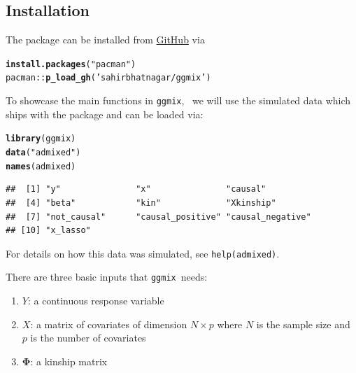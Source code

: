 \documentclass[12pt,letter]{article}\usepackage[]{graphicx}\usepackage[]{color}
\makeatletter
\newcommand{\hlstr}[1]{\textcolor[rgb]{0.192,0.494,0.8}{#1}}%
\newcommand{\hlopt}[1]{\textcolor[rgb]{0,0,0}{#1}}%
\newcommand{\hlstd}[1]{\textcolor[rgb]{0.345,0.345,0.345}{#1}}%
\newcommand{\hlkwd}[1]{\textcolor[rgb]{0.737,0.353,0.396}{\textbf{#1}}}%
\newenvironment{kframe}{%
 \def\at@end@of@kframe{}%
 \ifinner\ifhmode%
  \def\at@end@of@kframe{\end{minipage}}%
  \begin{minipage}{\columnwidth}%
 \fi\fi%
 \def\FrameCommand##1{\hskip\@totalleftmargin \hskip-\fboxsep
 \colorbox{shadecolor}{##1}\hskip-\fboxsep
     \hskip-\linewidth \hskip-\@totalleftmargin \hskip\columnwidth}%
 \MakeFramed {\advance\hsize-\width
   \@totalleftmargin\z@ \linewidth\hsize
   \@setminipage}}%
 {\par\unskip\endMakeFramed%
 \at@end@of@kframe}
\newenvironment{knitrout}{}{} %
\newcommand{\ggmix}{\texttt{ggmix}}
\makeatother
\begin{document}
\subsection{Installation}

The package can be installed from \href{https://github.com/sahirbhatnagar/ggmix}{GitHub} via


\begin{knitrout}\scriptsize
{}\color{fgcolor}\begin{kframe}
\begin{alltt}
\hlkwd{install.packages}\hlstd{(}\hlstr{"pacman"}\hlstd{)}
\hlstd{pacman}\hlopt{::}\hlkwd{p_load_gh}\hlstd{(}\hlstr{'sahirbhatnagar/ggmix'}\hlstd{)}
\end{alltt}
\end{kframe}
\end{knitrout}

To showcase the main functions in \ggmix, ~we will use the simulated data which ships with the package and can be loaded via:

\begin{knitrout}\scriptsize
{}\color{fgcolor}\begin{kframe}
\begin{alltt}
\hlkwd{library}\hlstd{(ggmix)}
\hlkwd{data}\hlstd{(}\hlstr{"admixed"}\hlstd{)}
\hlkwd{names}\hlstd{(admixed)}
\end{alltt}
\begin{verbatim}
##  [1] "y"               "x"               "causal"         
##  [4] "beta"            "kin"             "Xkinship"       
##  [7] "not_causal"      "causal_positive" "causal_negative"
## [10] "x_lasso"
\end{verbatim}
\end{kframe}
\end{knitrout}

For details on how this data was simulated, see \texttt{help(admixed)}.  

There are three basic inputs that \ggmix ~needs:  
\begin{enumerate}
	\item $Y$: a continuous response variable  
\item $X$: a matrix of covariates of dimension $N \times p$ where $N$ is the sample size and $p$ is the number of covariates  
\item $\boldsymbol{\Phi}$: a kinship matrix  
\end{enumerate}
\end{document}
